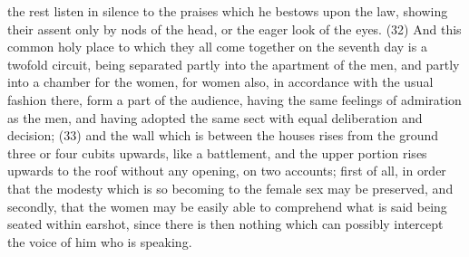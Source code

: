 the rest listen in silence to the praises which he bestows upon the law, showing their assent only by
nods of the head, or the eager look of the eyes. (32) And this common holy place to which they all
come together on the seventh day is a twofold circuit, being separated partly into the apartment of
the men, and partly into a chamber for the women, for women also, in accordance with the usual
fashion there, form a part of the audience, having the same feelings of admiration as the men, and
having adopted the same sect with equal deliberation and decision; (33) and the wall which is
between the houses rises from the ground three or four cubits upwards, like a battlement, and the
upper portion rises upwards to the roof without any opening, on two accounts; first of all, in order
that the modesty which is so becoming to the female sex may be preserved, and secondly, that the
women may be easily able to comprehend what is said being seated within earshot, since there is
then nothing which can possibly intercept the voice of him who is speaking.

